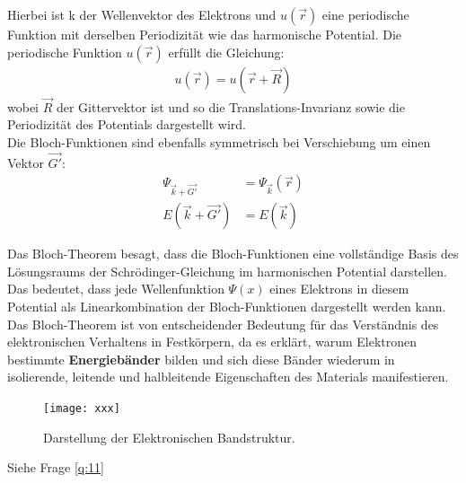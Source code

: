 Hierbei ist k der Wellenvektor des Elektrons und $u(\vec{r})$ eine periodische Funktion mit derselben Periodizität wie das harmonische Potential. Die periodische Funktion $u(\vec{r})$ erfüllt die Gleichung:
\begin{align}
    u(\vec{r}) = u(\vec{r}+\vec{R})
\end{align}
wobei $\vec{R} $ der Gittervektor ist und so die Translations-Invarianz sowie die Periodizität des Potentials dargestellt wird. \\

Die Bloch-Funktionen sind ebenfalls symmetrisch bei Verschiebung um einen Vektor $\vec{G'}$:
\begin{align}
    \Psi _{\vec{k} + \vec{G'}} &= \Psi _{\vec{k}} (\vec{r}) \\
    E(\vec{k} + \vec{G'}) &= E(\vec{k})
\end{align}

Das Bloch-Theorem besagt, dass die Bloch-Funktionen eine vollständige Basis des Lösungsraums der Schrödinger-Gleichung im harmonischen Potential darstellen. Das bedeutet, dass jede Wellenfunktion $\Psi(x)$ eines Elektrons in diesem Potential als Linearkombination der Bloch-Funktionen dargestellt werden kann. \\


Das Bloch-Theorem ist von entscheidender Bedeutung für das Verständnis des elektronischen Verhaltens in Festkörpern, da es erklärt, warum Elektronen bestimmte \textbf{Energiebänder} bilden und sich diese Bänder wiederum in isolierende, leitende und halbleitende Eigenschaften des Materials manifestieren.

\begin{figure}
    \centering
    \texttt{[image: xxx]}
    \caption{Darstellung der Elektronischen Bandstruktur.}
\end{figure}

\label{q:9}

\label{q:10}
Siehe Frage \ref{q:11}


\newpage
